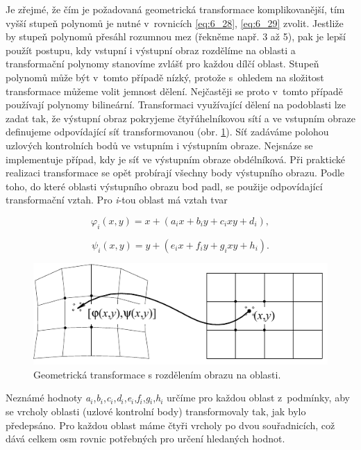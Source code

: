 Je zřejmé, že čím je požadovaná geometrická transformace komplikovanější, tím vyšší stupeň polynomů je nutné v~rovnicích \eqref{eq:6_28}, \eqref{eq:6_29} zvolit. Jestliže by stupeň polynomů přesáhl rozumnou mez (řekněme např. 3 až 5), pak je lepší použít postupu, kdy vstupní i výstupní obraz rozdělíme na oblasti a transformační polynomy stanovíme zvlášť pro každou dílčí oblast. Stupeň polynomů může být v~tomto případě nízký, protože s~ohledem na složitost transformace můžeme volit jemnost dělení. Nejčastěji se proto v~tomto případě používají polynomy bilineární. Transformaci využívající dělení na podoblasti lze zadat tak, že výstupní  obraz pokryjeme čtyřúhelníkovou sítí a ve vstupním obraze definujeme odpovídající síť transformovanou (obr. \ref{img:6_9}). Síť zadáváme polohou uzlových kontrolních bodů ve vstupním i výstupním obraze. Nejsnáze se implementuje případ, kdy je síť ve výstupním obraze obdélníková. Při praktické realizaci transformace se opět probírají všechny body výstupního obrazu. Podle toho, do které oblasti výstupního obrazu bod padl, se použije odpovídající transformační vztah. Pro \textit{i}-tou oblast má vztah tvar 

\begin{equation} \label{eq:6_31}
    \varphi _{i} \left(x,y\right)=x+\left(a_{i} x+b_{i} y+c_{i} xy+d_{i} \right),
\end{equation}

\begin{equation} \label{eq:6_32}
    \psi_{i} \left(x,y\right)=y+\left(e_{i} x+f_{i} y+g_{i} xy+h_{i} \right).
\end{equation}

\begin{figure}[th]
    \begin{center}
        \includegraphics[scale=1.0]{06_bodoveoperace/images/img_6_9.pdf}
    \end{center}
    \caption{Geometrická transformace s rozdělením obrazu na oblasti.}
    \label{img:6_9}
\end{figure}

Neznámé hodnoty \textit{a}$_i$,\textit{b}$_i$,\textit{c}$_i$,\textit{d}$_i$,\textit{e}$_i$,\textit{f}$_i$,\textit{g}$_i$,\textit{h}$_i$ určíme pro každou oblast z~podmínky, aby se vrcholy oblasti (uzlové kontrolní body) transformovaly tak, jak bylo předepsáno. Pro každou oblast máme čtyři vrcholy po dvou souřadnicích, což dává celkem osm rovnic potřebných pro určení hledaných hodnot.

